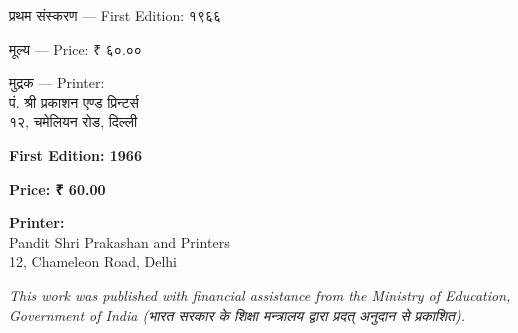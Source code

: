 \documentclass[11pt,a4paper]{article}
\newcommand{\dev}[1]{{\devanagarifont #1}}
\newcommand{\devbold}[1]{{\devanagarifontbold #1}}
\newenvironment{paracol}[1]{\begingroup}{\endgroup}
\newenvironment{leftcolumn*}{\begingroup}{\endgroup}
\newenvironment{rightcolumn}{\begingroup}{\endgroup}
\begin{document}
\vspace{0.5cm}

\begin{paracol}{2}
\begin{leftcolumn*}
\begin{center}
\devbold{प्रथम संस्करण — First Edition: १९६६}

\devbold{मूल्य — Price: ₹ ६०.००}

\devbold{मुद्रक — Printer:}\\
\dev{पं. श्री प्रकाशन एण्ड प्रिन्टर्स}\\
\dev{१२, चमेलियन रोड, दिल्ली}
\end{center}
\end{leftcolumn*}

\begin{rightcolumn}
\begin{center}
\textbf{First Edition: 1966}

\textbf{Price: ₹ 60.00}

\textbf{Printer:}\\
Pandit Shri Prakashan and Printers\\
12, Chameleon Road, Delhi
\end{center}
\end{rightcolumn}
\end{paracol}

\vspace{0.5cm}

\textit{This work was published with financial assistance from the Ministry of Education, Government of India (\dev{भारत सरकार के शिक्षा मन्त्रालय द्वारा प्रदत् अनुदान से प्रकाशित}).}

\newpage
\end{document}
